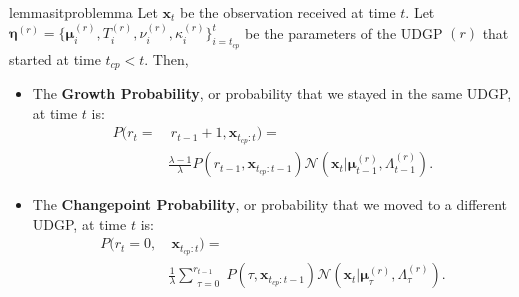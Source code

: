 \documentclass[10pt,a4paper]{amsart}
\begin{document}
\begin{restatable}{lemma}{sitproblemma} \label{lemma:sit-prob}
        Let $\boldsymbol{x}_t$ be the observation received at time $t$. Let $\boldsymbol{\eta}^{(r)} = \{\boldsymbol{\mu}_{i}^{(r)}, T_{i}^{(r)}, \nu_{i}^{(r)}, \kappa_{i}^{(r)}\}_{i=t_{cp}}^{t}$ be the parameters of the UDGP $(r)$ that started at time $t_{cp} < t$. Then, 
        \begin{itemize}[leftmargin=0.45cm]
            \item The \textbf{Growth Probability}, or probability that we stayed in the same UDGP, at time $t$ is: %
            \begin{align} \label{eq:permanence-prob}
                P(r_t = &~r_{t-1} + 1, \boldsymbol{x}_{t_{cp}:t}) = \\ &\frac{\lambda - 1}{\lambda} P(r_{t-1}, \boldsymbol{x}_{t_{cp}:t-1})  
                \mathcal{N} (\boldsymbol{x}_t | \boldsymbol{\mu}_{t-1}^{(r)}, \Lambda_{t-1}^{(r)}). \nonumber
            \end{align}
            \item The \textbf{Changepoint Probability}, or probability that we moved to a different UDGP, at time $t$ is:
            \begin{align} \label{eq:jump-prob}
                P(r_t = 0, &~\boldsymbol{x}_{t_{cp}:t}) = \\ & \frac{1}{\lambda} \sum_{\substack{\tau = 0}}^{r_{t-1}} P(\tau, \boldsymbol{x}_{t_{cp}:t-1}) 
                \mathcal{N} (\boldsymbol{x}_t | \boldsymbol{\mu}_{\tau}^{(r)}, \Lambda_{\tau}^{(r)}). \nonumber
            \end{align}
        \end{itemize}
\end{restatable}
\end{document}
